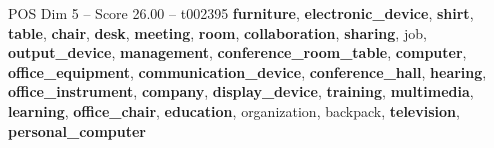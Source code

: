 \begin{textsample}{POS Dim 5 – Score 26.00 – t002395}  \label{ex:f5_pos_032}
\textbf{furniture}, \textbf{electronic\_device}, \textbf{shirt}, \textbf{table}, \textbf{chair}, \textbf{desk}, \textbf{meeting}, \textbf{room}, \textbf{collaboration}, \textbf{sharing}, job, \textbf{output\_device}, \textbf{management}, \textbf{conference\_room\_table}, \textbf{computer}, \textbf{office\_equipment}, \textbf{communication\_device}, \textbf{conference\_hall}, \textbf{hearing}, \textbf{office\_instrument}, \textbf{company}, \textbf{display\_device}, \textbf{training}, \textbf{multimedia}, \textbf{learning}, \textbf{office\_chair}, \textbf{education}, organization, backpack, \textbf{television}, \textbf{personal\_computer}

\end{textsample}
